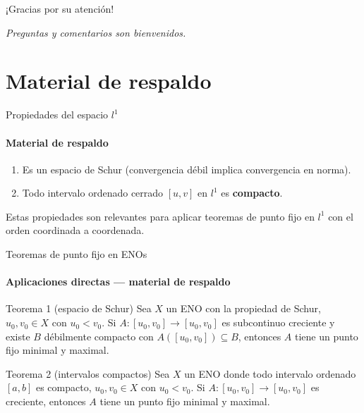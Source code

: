 \documentclass{beamer}
\begin{document}

\begin{frame}[noframenumbering]{}
\begin{center}
    \Huge ¡Gracias por su atención!

    \bigskip
    \normalsize
    \textit{Preguntas y comentarios son bienvenidos.}
\end{center}
\end{frame}

\section{Material de respaldo}


\begin{frame}[noframenumbering]{Propiedades del espacio $l^1$}
\framesubtitle{Material de respaldo}
\begin{enumerate}
    \item Es un espacio de Schur
          (convergencia débil implica convergencia en norma).
    \item Todo intervalo ordenado cerrado $[u,v]$ en $l^1$ es
          \textbf{compacto}.
\end{enumerate}

\medskip

Estas propiedades son relevantes para aplicar teoremas de punto fijo
en $l^1$ con el orden coordinada a coordenada.
\end{frame}


\begin{frame}[noframenumbering]{Teoremas de punto fijo en ENOs}
\framesubtitle{Aplicaciones directas — material de respaldo}

\begin{block}{Teorema 1 (espacio de Schur)}
Sea $X$ un ENO con la propiedad de Schur, $u_0,v_0\in X$ con
$u_0<v_0$.
Si $A:[u_0,v_0]\to[u_0,v_0]$ es subcontinuo creciente y existe $B$
débilmente compacto con $A([u_0,v_0])\subseteq B$,
entonces $A$ tiene un punto fijo minimal y maximal.
\end{block}

\begin{block}{Teorema 2 (intervalos compactos)}
Sea $X$ un ENO donde todo intervalo ordenado $[a,b]$ es compacto,
$u_0,v_0\in X$ con $u_0<v_0$.
Si $A:[u_0,v_0]\to[u_0,v_0]$ es creciente,
entonces $A$ tiene un punto fijo minimal y maximal.
\end{block}

\end{frame}
\end{document}

